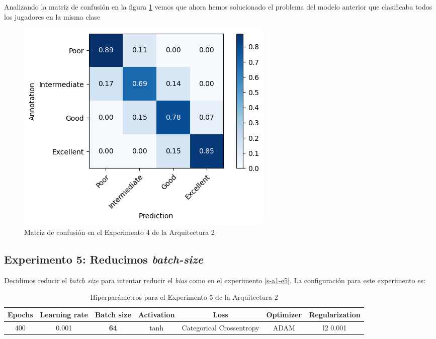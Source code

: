 \documentclass{article}
\begin{document}
			Analizando la matriz de confusi\'on en la figura \ref{cm-a2-e4} vemos que ahora hemos solucionado el problema del modelo anterior que clasificaba todos los jugadores en la misma clase
			\begin{figure}[!h]
				\begin{center}
					\includegraphics[scale=0.7]{cm-a2-e4.png}		
					\caption{Matriz de confusi\'on en el Experimento 4 de la Arquitectura 2}	
					\label{cm-a2-e4}
				\end{center}
			\end{figure}
		\newpage
		\subsection{Experimento 5: Reducimos \textit{batch-size}}
		\label{s-a2-e5}
			Decidimos reducir el \textit{batch size} para intentar reducir el \textit{bias} como en el experimento \ref{s-a1-e5}. La configuraci\'on para este experimento es:
			\begin{table}[!h]
				\begin{tabular}{| c | c | c | c | c | c | c |}
					\textbf{Epochs} & \textbf{Learning rate} & \textbf{Batch size} & \textbf{Activation} & \textbf{Loss} & \textbf{Optimizer} & \textbf{Regularization} \\ \hline
					400 & 0.001 & \textbf{64} & tanh & Categorical Crossentropy & ADAM & l2 0.001
				\end{tabular}
				\caption{Hiperpar\'ametros para el Experimento 5 de la Arquitectura 2}
				\label{tab:hip-a2-e5}
			\end{table}
			
\end{document}

